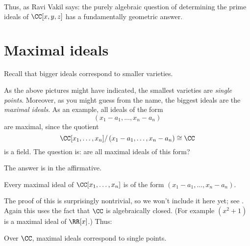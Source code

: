 Thus, as Ravi Vakil \cite{ref:vakil} says:
the purely algebraic question
of determining the prime ideals of $\CC[x,y,z]$
has a fundamentally geometric answer.

\section{Maximal ideals}
Recall that bigger ideals correspond to smaller varieties.

As the above pictures might have indicated,
the smallest varieties are \emph{single points}.
Moreover, as you might guess from the name,
the biggest ideals are the \emph{maximal ideals}.
As an example, all ideals of the form
\[ \left( x_1-a_1, \dots, x_n-a_n \right) \]
are maximal, since the quotient
\[ \CC[x_1, \dots, x_n] / \left( x_1-a_1, \dots, x_n-a_n \right) \cong \CC \]
is a field.
The question is: are all maximal ideals of this form?

The answer is in the affirmative.
\begin{theorem}
	Every maximal ideal of $\CC[x_1, \dots, x_n]$
	is of the form $(x_1-a_1, \dots, x_n-a_n)$.
\end{theorem}
The proof of this is surprisingly nontrivial,
so we won't include it here yet; see \cite[\S7.4.3]{ref:vakil}.
Again this uses the fact that $\CC$ is algebraically closed.
(For example $(x^2+1)$ is a maximal ideal of $\RR[x]$.)
Thus:
\begin{moral}
	Over $\CC$, maximal ideals correspond to single points.
\end{moral}


